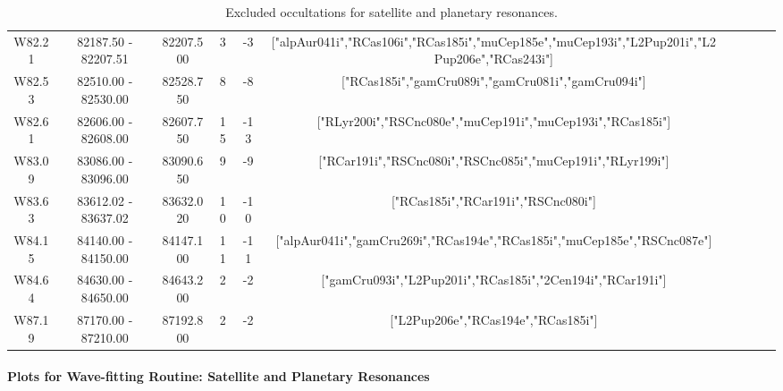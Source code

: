 \documentclass{article}
\begin{document}
\begin{table}
{\begin{tabular}{|c|c|c|c|c|c|c|c|c|c|}
W82.21 & 82187.50 - 82207.51 & 82207.500 & 3 & -3 & ["alpAur041i","RCas106i","RCas185i","muCep185e","muCep193i","L2Pup201i","L2Pup206e","RCas243i"]\\
W82.53 & 82510.00 - 82530.00 & 82528.750 & 8 & -8 & ["RCas185i","gamCru089i","gamCru081i","gamCru094i"]\\
W82.61 & 82606.00 - 82608.00 & 82607.750 & 15 & -13 & ["RLyr200i","RSCnc080e","muCep191i","muCep193i","RCas185i"]\\
W83.09 & 83086.00 - 83096.00 & 83090.650 & 9 & -9 & ["RCar191i","RSCnc080i","RSCnc085i","muCep191i","RLyr199i"]\\
W83.63 & 83612.02 - 83637.02 & 83632.020 & 10 & -10 & ["RCas185i","RCar191i","RSCnc080i"]\\
W84.15 & 84140.00 - 84150.00 & 84147.100 & 11 & -11 & ["alpAur041i","gamCru269i","RCas194e","RCas185i","muCep185e","RSCnc087e"]\\
W84.64 & 84630.00 - 84650.00 & 84643.200 & 2 & -2 & ["gamCru093i","L2Pup201i","RCas185i","2Cen194i","RCar191i"]\\
W87.19 & 87170.00 - 87210.00 & 87192.800 & 2 & -2 & ["L2Pup206e","RCas194e","RCas185i"]\\
\hline
\end{tabular}
\vspace{-1.5cm}
}
\caption{Excluded occultations for satellite and planetary resonances.}
\end{table}




\paragraph{Plots for Wave-fitting Routine: Satellite and Planetary Resonances}
\end{document}
